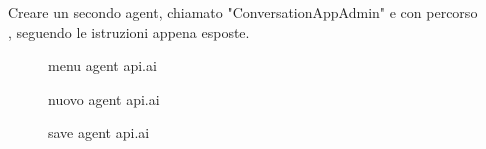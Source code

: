 Creare un secondo agent, chiamato "ConversationAppAdmin" e con percorso\\ , seguendo le istruzioni appena esposte.
\begin{figure}[h]
	\caption{menu agent api.ai}\label{fig:menuapi}
\end{figure}
\begin{figure}[h]
	\caption{nuovo agent api.ai}\label{fig:newAgent}
\end{figure}
\begin{figure}[h]
	\caption{save agent api.ai}\label{fig:saveAgent}
\end{figure}
